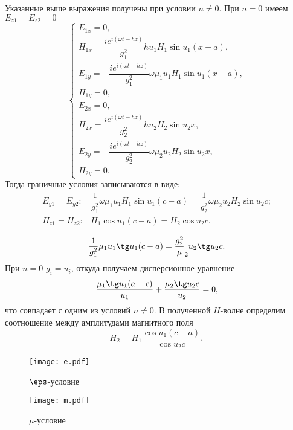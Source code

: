 \documentclass[12pt]{hedsemwork}
\renewcommand{\frac}{\dfrac}
\begin{document}
Указанные выше выражения получены при условии \( n \neq 0 \). При \( n = 0 \)
имеем \( E_{z1} = E_{z2} = 0 \)
\[
    \left\{
    \begin{array}{l}
        E_{1x} = 0, \\
        H_{1x} = \frac{i e^{i(\omega t - h z)}}{g_1^2}
        h u_1 H_1 \sin u_1 (x-a),\\
        E_{1y} = -\frac{i e^{i(\omega t - h z)}}{g_1^2}
        \omega\mu_1u_1H_1 \sin u_1 (x-a),\\
        H_{1y} = 0,\\
        E_{2x} = 0,\\
        H_{2x} = \frac{i e^{i(\omega t - h z)}}{g_2^2}
        h u_2 H_2 \sin u_2 x,\\
        E_{2y} = -\frac{i e^{i(\omega t - h z)}}{g_2^2}
        \omega\mu_2u_2H_2 \sin u_2 x,\\
        H_{2y} = 0.
    \end{array}
    \right.
\]
Тогда граничные условия записываются в виде:
\[
\begin{array}{cl}
    E_{y1} = E_{y2}: &
    \frac{1}{g_1^2}  \omega\mu_1u_1H_1 \sin u_1 (c-a) =
    \frac{1}{g_2^2}  \omega\mu_2u_2H_2 \sin u_2 c ;\\
    H_{z1} = H_{z2}: & H_1\cos u_1 (c-a) = H_2\cos u_2 c.\\
\end{array}
\]
\[
    \frac{1}{g_1^2} \mu_1 u_1 \tg u_1 (c-a) = \frac{g_2^2} \mu_2 u_2 \tg u_2 c.
\]
При \( n=0 \) \( g_i = u_i \), откуда получаем дисперсионное уравнение
\[
    \frac{\mu_1\tg u_1 (a-c)}{u_1} + \frac{\mu_2\tg u_2 c}{u_2} = 0,
\]
что совпадает с одним из условий \( n \neq 0 \).
В полученной \( H \)-волне определим соотношение между амплитудами магнитного
поля
\[
    H_2 = H_1\frac{\cos u_1 (c-a)}{\cos u_2 c},
\]
\begin{figure}
    \texttt{[image: e.pdf]}
    \caption{\( \eps \)-условие}
\end{figure}
\begin{figure}
    \texttt{[image: m.pdf]}
    \caption{\( \mu \)-условие}
\end{figure}
\end{document}
